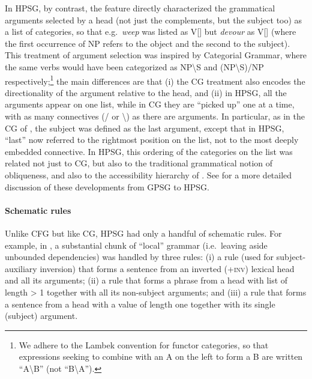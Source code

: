 \documentclass[output=paper
 	        ,biblatex
                ,babelshorthands
                ,newtxmath
                ,draftmode
                ,colorlinks, citecolor=brown
]{langscibook}
\begin{document}
\noindent
In HPSG, by contrast, the
\subcat feature directly characterized the grammatical arguments selected by a head (not just the
complements, but the subject too) as a list of categories, so that e.g.~\emph{weep} was listed as
V[\subcat {}] but \emph{devour} as V[\subcat {}] (where the first occurrence of NP refers to the object and the second to the subject). This treatment of argument selection was inspired by Categorial Grammar, where the same verbs would have been categorized as NP{\textbackslash}S and (NP{\textbackslash}S)/NP respectively;\footnote{We adhere to the Lambek convention for functor categories, so that expressions seeking to combine with an A on the left to form a B are written ``A{\textbackslash}B'' (not ``B{\textbackslash}A'').} the main differences are that (i) the CG treatment also encodes the directionality of the argument relative to the head, and (ii) in HPSG, all the arguments appear on one list, while in CG they are ``picked up'' one at a time, with as many
connectives (/ or \textbackslash) as there are arguments. In particular, as in the CG of \citet{Dowty82b}, the subject was defined as the last argument, except that in HPSG, ``last'' now referred to the rightmost position on the \subcat list, not to the most deeply embedded connective. In HPSG, this
ordering of the categories on the \subcat list was related not just to CG, but also to the traditional grammatical notion of obliqueness, and also to the accessibility hierarchy of \citet{KC77a}.  See \citet[Section 4]{MWArgSt} for a more detailed discussion of these developments from GPSG to HPSG.\label{page-subcategorization-end}

\paragraph*{Schematic rules} Unlike CFG but like CG, HPSG had only a handful of schematic rules. For example, in \citet{Pollard85a-u}, a substantial chunk of  ``local'' grammar (i.e.~leaving aside unbounded dependencies) was handled by three rules: (i) a rule (used for subject-auxiliary inversion) that forms a sentence from an inverted (+\textsc{inv}) lexical head and all its arguments; (ii) a rule that forms a phrase from a head with \subcat list of length > 1 together with all its non-subject arguments; and (iii) a rule that forms a sentence from a head with a \subcat value of length one together with its single (subject) argument.
\end{document}
